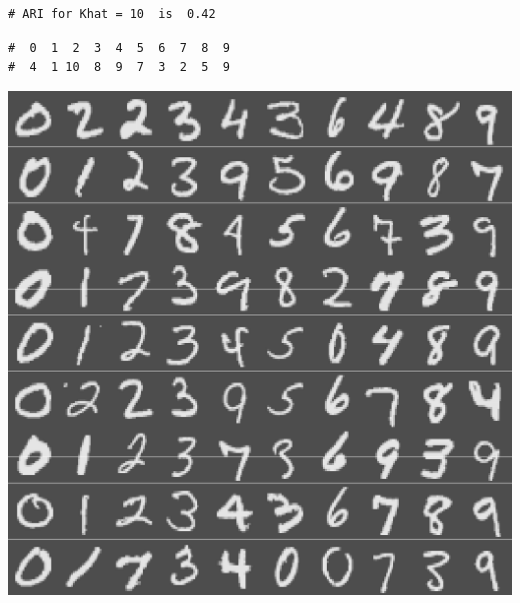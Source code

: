 \documentclass[]{article}
\begin{document}
\begin{verbatim}
# ARI for Khat = 10  is  0.42
\end{verbatim}

\begin{verbatim}
#  0  1  2  3  4  5  6  7  8  9 
#  4  1 10  8  9  7  3  2  5  9
\end{verbatim}

\includegraphics{gmmase_files/figure-latex/knnplot-4.pdf}
\end{document}
